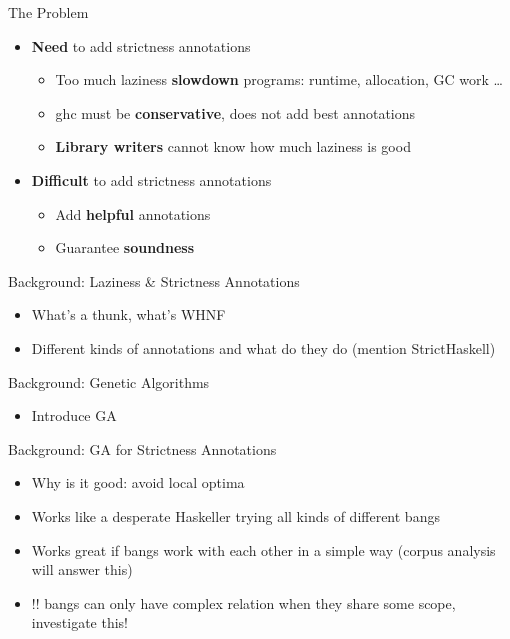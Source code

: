 \documentclass{beamer}
\begin{document}
\begin{frame}{The Problem}
\begin{itemize}
\item \textbf{Need} to add strictness annotations
  \begin{itemize}
    \item Too much laziness \textbf{slowdown} programs: runtime, allocation, GC work \dots
    \item ghc must be \textbf{conservative}, does not add best annotations
    \item \textbf{Library writers} cannot know how much laziness is good
  \end{itemize}
\item \textbf{Difficult} to add strictness annotations
  \begin{itemize}
    \item Add \textbf{helpful} annotations
    \item Guarantee \textbf{soundness}
  \end{itemize}
\end{itemize}
\end{frame}

\begin{frame}{Background: Laziness \& Strictness Annotations}
  \begin{itemize}
    \item What's a thunk, what's WHNF
    \item Different kinds of annotations and what do they do (mention StrictHaskell)
  \end{itemize}
\end{frame}

\begin{frame}{Background: Genetic Algorithms}
  \begin{itemize}
    \item Introduce GA
  \end{itemize}
\end{frame}

\begin{frame}{Background: GA for Strictness Annotations}
  \begin{itemize}
    \item Why is it good: avoid local optima
    \item Works like a desperate Haskeller trying all kinds of different bangs
    \item Works great if bangs work with each other in a simple way (corpus analysis will answer this)
    \item !! bangs can only have complex relation when they share some scope, investigate this!
  \end{itemize}
\end{frame}
\end{document}
